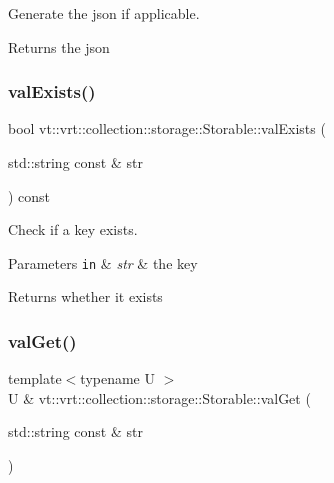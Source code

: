 Generate the json if applicable. 

\begin{DoxyReturn}{Returns}
the json 
\end{DoxyReturn}
\mbox{\label{structvt_1_1vrt_1_1collection_1_1storage_1_1_storable_a46884264a54e5be7fc231208dc468b8e}} 
\subsubsection{\texorpdfstring{val\+Exists()}{valExists()}}
{\footnotesize\ttfamily bool vt\+::vrt\+::collection\+::storage\+::\+Storable\+::val\+Exists (\begin{DoxyParamCaption}\item[{std\+::string const \&}]{str }\end{DoxyParamCaption}) const}



Check if a key exists. 


\begin{DoxyParams}[1]{Parameters}
\mbox{\tt in}  & {\em str} & the key\\
\hline
\end{DoxyParams}
\begin{DoxyReturn}{Returns}
whether it exists 
\end{DoxyReturn}
\mbox{\label{structvt_1_1vrt_1_1collection_1_1storage_1_1_storable_a81a60463dff73c6375422344c8eb410c}} 
\subsubsection{\texorpdfstring{val\+Get()}{valGet()}\hspace{0.1cm}{\footnotesize\ttfamily [1/2]}}
{\footnotesize\ttfamily template$<$typename U $>$ \\
U \& vt\+::vrt\+::collection\+::storage\+::\+Storable\+::val\+Get (\begin{DoxyParamCaption}\item[{std\+::string const \&}]{str }\end{DoxyParamCaption})}



